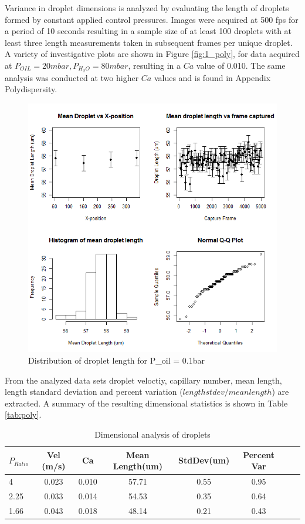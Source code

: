 Variance in droplet dimensions is analyzed by evaluating the length of droplets formed by constant applied control pressures. Images were acquired at 500 fps for a period of 10 seconds resulting in a sample size of at least 100 droplets with at least three length measurements taken in subsequent frames per unique droplet. A variety
 of investigative plots are shown in Figure \vref{fig:1_poly}, for data acquired at $P_{OIL} = 20mbar,  P_{H_2O} = 80mbar$, resulting in a $Ca$ value of 0.010. The same analysis was conducted at two higher $Ca$ values and is found in Appendix Polydispersity.

\begin{figure}[H]
\centering 
\includegraphics[width=01.0\columnwidth]{1_poly.PNG} 
\caption[Polydispersity]{Distribution of droplet length for P_oil = 0.1bar} 
\label{fig:1_poly} 
\end{figure}


\clearpage

From the analyzed data sets droplet veloctiy, capillary number, mean length, length standard deviation and percent variation ($length stdev / mean length$) are extracted. A summary of the resulting dimensional statistics is shown in Table \vref{tab:poly}.

\qquad

\begin{table}
\begin{tabular}{l*{6}{c}r}
$P_{Ratio}$ & Vel (m/s) & Ca & Mean Length(um) & StdDev(um) & Percent Var \\
\hline
4 & 0.023 & 0.010 & 57.71 & 0.55 & 0.95 \\
2.25 & 0.033 & 0.014 & 54.53 & 0.35 &  0.64 \\
1.66 & 0.043 & 0.018 & 48.14 & 0.21 &  0.43 \\
\end{tabular}
\caption[Droplet Polydispersity]{Dimensional analysis of droplets}
\label{tab:poly} 
\end{table}



